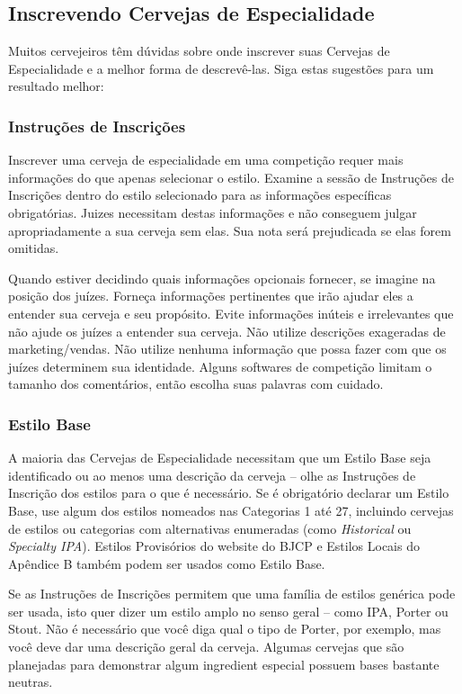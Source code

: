 \subsection*{Inscrevendo Cervejas de Especialidade}
Muitos cervejeiros têm dúvidas sobre onde inscrever suas Cervejas de Especialidade e a melhor forma de descrevê-las. Siga estas sugestões para um resultado melhor:
\subsubsection*{Instruções de Inscrições}
Inscrever uma cerveja de especialidade em uma competição requer mais informações do que apenas selecionar o estilo. Examine a sessão de Instruções de Inscrições dentro do estilo selecionado para as informações específicas obrigatórias. Juizes necessitam destas informações e não conseguem julgar apropriadamente a sua cerveja sem elas. Sua nota será prejudicada se elas forem omitidas.

Quando estiver decidindo quais informações opcionais fornecer, se imagine na posição dos juízes. Forneça informações pertinentes que irão ajudar eles a entender sua cerveja e seu propósito. Evite informações inúteis e irrelevantes que não ajude os juízes a entender sua cerveja. Não utilize descrições exageradas de marketing/vendas. Não utilize nenhuma informação que possa fazer com que os juízes determinem sua identidade. Alguns softwares de competição limitam o tamanho dos comentários, então escolha suas palavras com cuidado.

\subsubsection*{Estilo Base}
A maioria das Cervejas de Especialidade necessitam que um Estilo Base seja identificado ou ao menos uma descrição da cerveja – olhe as Instruções de Inscrição dos estilos para o que é necessário. Se é obrigatório declarar um Estilo Base, use algum dos estilos nomeados nas Categorias 1 até 27, incluindo cervejas de estilos ou categorias com alternativas enumeradas (como \textit{Historical} ou \textit{Specialty IPA}). Estilos Provisórios do website do BJCP e Estilos Locais do Apêndice B também podem ser usados como Estilo Base.

Se as Instruções de Inscrições permitem que uma família de estilos genérica pode ser usada, isto quer dizer um estilo amplo no senso geral – como IPA, Porter ou Stout. Não é necessário que você diga qual o tipo de Porter, por exemplo, mas você deve dar uma descrição geral da cerveja. Algumas cervejas que são planejadas para demonstrar algum ingredient especial possuem bases bastante neutras.

